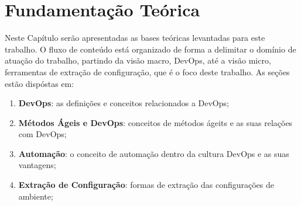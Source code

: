 \newpage\null\thispagestyle{empty}\newpage
\chapter{Fundamentação Teórica}
\label{chap:teoria}

Neste Capítulo serão apresentadas as bases teóricas levantadas para este trabalho.
O fluxo de conteúdo está organizado de forma a delimitar o domínio de atuação
do trabalho, partindo da visão macro, DevOps, até a visão micro, ferramentas de
extração de configuração, que é o foco deste trabalho. As seções estão dispóstas em:

\begin{enumerate}
  \item \textbf{DevOps}: as definições e conceitos relacionados a DevOps;
  \item \textbf{Métodos Ágeis e DevOps}: conceitos de métodos ágeits e as 
suas relações com DevOps;
  \item \textbf{Automação}: o conceito de automação dentro da cultura DevOps e as suas vantagens;
  \item \textbf{Extração de Configuração}: formas de extração das configurações de ambiente;
\end{enumerate}





